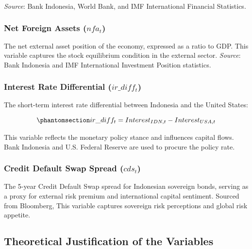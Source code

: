 \documentclass[
  manuscript=article,
  layout=publish,
  year=2026,
  volume=6,
]{den}
\begin{document}
\emph{Source}: Bank Indonesia, World Bank, and IMF International
Financial Statistics.

\subsubsection{\texorpdfstring{Net Foreign Assets
(\(nfa_t\))}{Net Foreign Assets (nfa\_t)}}\label{net-foreign-assets-nfa_t}

The net external asset position of the economy, expressed as a ratio to
GDP. This variable captures the stock equilibrium condition in the
external sector. \emph{Source}: Bank Indonesia and IMF International
Investment Position statistics.

\subsubsection{\texorpdfstring{Interest Rate Differential
(\(ir\_diff_t\))}{Interest Rate Differential (ir\textbackslash\_diff\_t)}}\label{interest-rate-differential-ir_diff_t}

The short-term interest rate differential between Indonesia and the
United States:

\begin{equation}\phantomsection\label{eq-interest-differential}{
ir\_diff_t = Interest_{IDN,t} - Interest_{USA,t}
}\end{equation}

This variable reflects the monetary policy stance and influences capital
flows. Bank Indonesia and U.S. Federal Reserve are used to procure the
policy rate.

\subsubsection{\texorpdfstring{Credit Default Swap Spread
(\(cds_t\))}{Credit Default Swap Spread (cds\_t)}}\label{credit-default-swap-spread-cds_t}

The 5-year Credit Default Swap spread for Indonesian sovereign bonds,
serving as a proxy for external risk premium and international capital
sentiment. Sourced from Bloomberg, This variable captures sovereign risk
perceptions and global risk appetite.

\subsection{Theoretical Justification of the
Variables}\label{theoretical-justification-of-the-variables}
\end{document}
